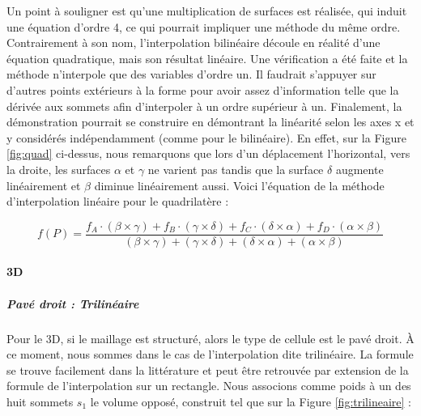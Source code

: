 Un point à souligner est qu'une multiplication de surfaces est réalisée, qui induit une équation d'ordre 4, ce qui pourrait impliquer une méthode du même ordre.
Contrairement à son nom, l'interpolation bilinéaire découle en réalité d'une équation quadratique, mais son résultat linéaire.
Une vérification a été faite et la méthode n'interpole que des variables d'ordre un.
Il faudrait s'appuyer sur d'autres points extérieurs à la forme pour avoir assez d'information telle que la dérivée aux sommets afin d'interpoler à un ordre supérieur à un.
Finalement, la démonstration pourrait se construire en démontrant la linéarité selon les axes x et y considérés indépendamment (comme pour le bilinéaire). En effet, sur la Figure \ref{fig:quad} ci-dessus, nous remarquons que lors d'un déplacement l'horizontal, vers la droite, les surfaces \(\alpha\) et \(\gamma\) ne varient pas tandis que la surface \(\delta\) augmente linéairement et \(\beta\) diminue linéairement aussi.
Voici l'équation de la méthode d'interpolation linéaire pour le quadrilatère :

\begin{equation}
    f(P) = \frac{f_{A} \cdot (\beta \times \gamma) + f_{B} \cdot (\gamma \times \delta) + f_{C} \cdot (\delta \times \alpha) + f_{D} \cdot (\alpha \times \beta)}{(\beta \times \gamma) + (\gamma \times \delta) + (\delta \times \alpha) + (\alpha \times \beta)}
\end{equation}
    

\vspace{0.2cm}  %


\paragraph{3D}
\subparagraph{Pavé droit : Trilinéaire}

Pour le 3D, si le maillage est structuré, alors le type de cellule est le pavé droit. À ce moment, nous sommes dans le cas de l'interpolation dite trilinéaire. La formule se trouve facilement dans la littérature et peut être retrouvée par extension de la formule de l'interpolation sur un rectangle. Nous associons comme poids à un des huit sommets \( s_1 \) le volume opposé, construit tel que sur la Figure \ref{fig:trilineaire} :

